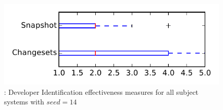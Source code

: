 
\begin{figure}
\centering
\includegraphics[height=0.4\textheight]{figures/dit_seed/rq1_tiny_14}
\caption{\rtwo: Developer Identification effectiveness measures for all subject systems with $seed=14$}
\label{fig:dit_seed:rq1:tiny}
\end{figure}
